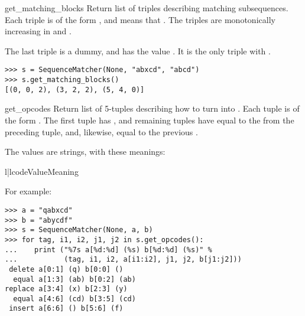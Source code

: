 \begin{methoddesc}{get_matching_blocks}{}
  Return list of triples describing matching subsequences.
  Each triple is of the form , and
  means that .  The triples are monotonically
  increasing in  and .

  The last triple is a dummy, and has the value .  It is the only triple with .

\begin{verbatim}
>>> s = SequenceMatcher(None, "abxcd", "abcd")
>>> s.get_matching_blocks()
[(0, 0, 2), (3, 2, 2), (5, 4, 0)]
\end{verbatim}
\end{methoddesc}

\begin{methoddesc}{get_opcodes}{}
  Return list of 5-tuples describing how to turn  into .
  Each tuple is of the form .  The first tuple has , and remaining tuples have  equal to the
   from the preceding tuple, and, likewise,  equal to
  the previous .

  The  values are strings, with these meanings:

\begin{tableii}{l|l}{code}{Value}{Meaning}
\end{tableii}

For example:

\begin{verbatim}
>>> a = "qabxcd"
>>> b = "abycdf"
>>> s = SequenceMatcher(None, a, b)
>>> for tag, i1, i2, j1, j2 in s.get_opcodes():
...    print ("%7s a[%d:%d] (%s) b[%d:%d] (%s)" %
...           (tag, i1, i2, a[i1:i2], j1, j2, b[j1:j2]))
 delete a[0:1] (q) b[0:0] ()
  equal a[1:3] (ab) b[0:2] (ab)
replace a[3:4] (x) b[2:3] (y)
  equal a[4:6] (cd) b[3:5] (cd)
 insert a[6:6] () b[5:6] (f)
\end{verbatim}
\end{methoddesc}

